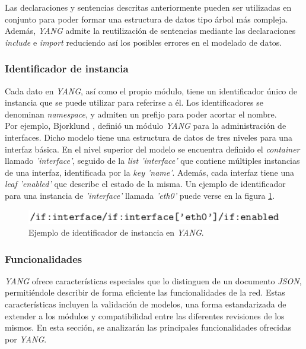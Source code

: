 Las declaraciones y sentencias descritas anteriormente pueden ser utilizadas en conjunto para poder formar una estructura de datos tipo árbol más compleja.
Además, \textit{YANG} admite la reutilización de sentencias mediante las declaraciones \textit{include} e \textit{import} reduciendo así los posibles errores en el modelado de datos.

\subsubsection{Identificador de instancia }
Cada dato en \textit{YANG}, así como el propio módulo, tiene un identificador único de instancia que se puede utilizar para referirse a él. Los identificadores se denominan \textit{namespace}, y admiten un prefijo para poder acortar el nombre. 
\\

Por ejemplo, Bjorklund \parencite{yangsystem}, definió un módulo \textit{YANG} para la administración de interfaces. Dicho modelo tiene una estructura de datos de tres niveles para una interfaz básica. En el nivel superior del modelo se encuentra definido el \textit{container} llamado \textit{'interface'}, seguido de la \textit{list 'interface'} que contiene múltiples instancias de una interfaz, identificada por la \textit{key 'name'}. Además, cada interfaz tiene una \textit{leaf 'enabled'} que describe el estado de la misma. Un ejemplo de identificador para una instancia de \textit{'interface'} llamada \textit{'eth0'} puede verse en la figura \ref{fig:interfaceyang}.

\begin{figure}[htbp]
	\centering
	\includegraphics[scale=0.7]{Figures/interface-yang.pdf}
	\caption{Ejemplo de identificador de instancia en \textit{YANG}.}
	\label{fig:interfaceyang}
  \end{figure}

  \subsubsection{Funcionalidades}
  \textit{YANG} ofrece características especiales que lo distinguen de un documento \textit{JSON}, permitiéndole describir de forma eficiente las funcionalidades de la red. Estas características incluyen la validación de modelos, una forma estandarizada de extender a los módulos y compatibilidad entre las diferentes revisiones de los mismos. En esta sección, se analizarán las principales funcionalidades ofrecidas por \textit{YANG}.

